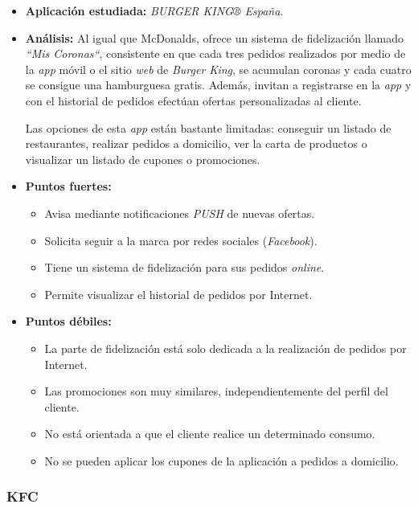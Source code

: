 \documentclass[twoside]{report}
\begin{document}
\begin{itemize}
\item \textbf{Aplicación estudiada:} \cite{burgerk} \textit{BURGER KING® España.}
\item \textbf{Análisis:} 
Al igual que McDonalds, ofrece un sistema de fidelización llamado \textit{“Mis Coronas“}, consistente en que cada tres pedidos realizados por medio de la \textit{app} móvil o el sitio \textit{web} de \textit{Burger King}, se acumulan coronas y cada cuatro se consigue una hamburguesa gratis. Además, invitan a registrarse en la \textit{app} y con el historial de pedidos efectúan ofertas personalizadas al cliente.

Las opciones de esta \textit{app} están bastante limitadas: conseguir un listado de restaurantes, realizar pedidos a domicilio, ver la carta de productos o visualizar un listado de cupones o promociones.

\item \textbf{Puntos fuertes:}
	\begin{itemize}
	\item Avisa mediante notificaciones \textit{PUSH} de nuevas ofertas.
	\item Solicita seguir a la marca por redes sociales (\textit{Facebook}).
	\item Tiene un sistema de fidelización para sus pedidos \textit{online}.
	\item Permite visualizar el historial de pedidos por Internet.
	\end{itemize}
\item \textbf{Puntos débiles:}
	\begin{itemize}
		\item La parte de fidelización está solo dedicada a la realización de pedidos por Internet.
		\item Las promociones son muy similares, independientemente del perfil del cliente.
		\item No está orientada a que el cliente realice un determinado consumo.
		\item No se pueden aplicar los cupones de la aplicación a pedidos a domicilio.
	\end{itemize}
\end{itemize}

\subsubsection{KFC}
\end{document}
